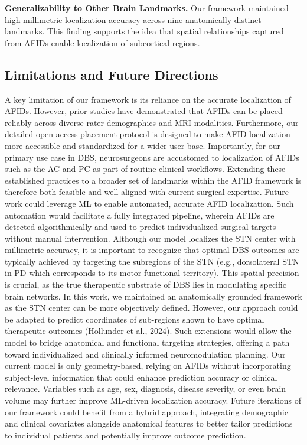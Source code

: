 \textbf{Generalizability to Other Brain Landmarks.} Our framework maintained high millimetric localization accuracy across nine anatomically distinct landmarks. This finding supports the idea that spatial relationships captured from AFIDs enable localization of subcortical regions.

\subsection{Limitations and Future Directions}
A key limitation of our framework is its reliance on the accurate localization of AFIDs. However, prior studies have demonstrated that AFIDs can be placed reliably across diverse rater demographics and MRI modalities. Furthermore, our detailed open-access placement protocol is designed to make AFID localization more accessible and standardized for a wider user base. Importantly, for our primary use case in DBS, neurosurgeons are accustomed to localization of AFIDs such as the AC and PC as part of routine clinical workflows. Extending these established practices to a broader set of landmarks within the AFID framework is therefore both feasible and well-aligned with current surgical expertise. Future work could leverage ML to enable automated, accurate AFID localization. Such automation would facilitate a fully integrated pipeline, wherein AFIDs are detected algorithmically and used to predict individualized surgical targets without manual intervention.
Although our model localizes the STN center with millimetric accuracy, it is important to recognize that optimal DBS outcomes are typically achieved by targeting the subregions of the STN (e.g., dorsolateral STN in PD which corresponds to its motor functional territory). This spatial precision is crucial, as the true therapeutic substrate of DBS lies in modulating specific brain networks. In this work, we maintained an anatomically grounded framework as the STN center can be more objectively defined. However, our approach could be adapted to predict coordinates of sub-regions shown to have optimal therapeutic outcomes (Hollunder et al., 2024). Such extensions would allow the model to bridge anatomical and functional targeting strategies, offering a path toward individualized and clinically informed neuromodulation planning.
Our current model is only geometry-based, relying on AFIDs without incorporating subject-level information that could enhance prediction accuracy or clinical relevance. Variables such as age, sex, diagnosis, disease severity, or even brain volume may further improve ML-driven localization accuracy. Future iterations of our framework could benefit from a hybrid approach, integrating demographic and clinical covariates alongside anatomical features to better tailor predictions to individual patients and potentially improve outcome prediction.
